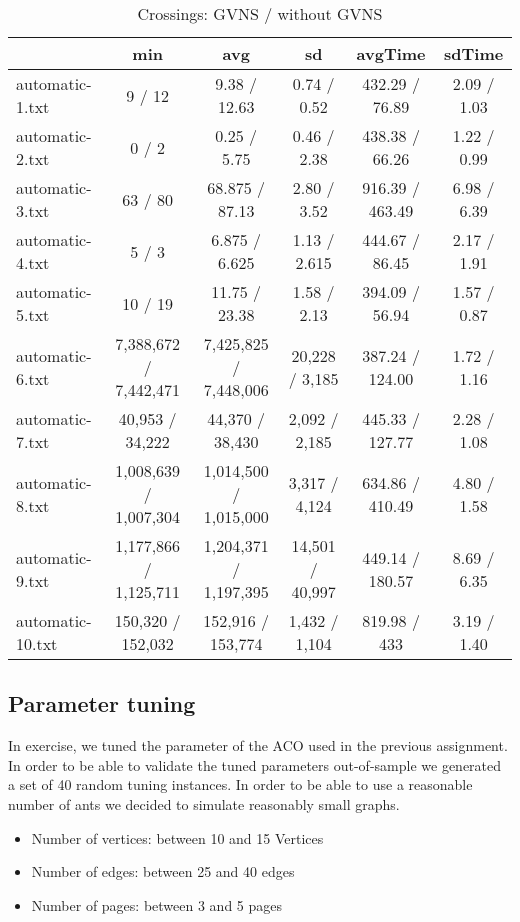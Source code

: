 \documentclass{scrartcl}
\begin{document}
\begin{table}
\scriptsize
\begin{tabular}{lccccc}
  \toprule  & min & avg & sd & avgTime & sdTime \\ 
  \midrule automatic-1.txt & 9 / 12 & 9.38 / 12.63 & 0.74 / 0.52 & 432.29 / 76.89 & 2.09 / 1.03 \\ 
  automatic-2.txt & 0 / 2 & 0.25 / 5.75  & 0.46 / 2.38 & 438.38 / 66.26 & 1.22 / 0.99 \\ 
  automatic-3.txt & 63 / 80 & 68.875 / 87.13 & 2.80 / 3.52 & 916.39 / 463.49 & 6.98 / 6.39 \\ 
  automatic-4.txt & 5 / 3 & 6.875 / 6.625 & 1.13 / 2.615 & 444.67 / 86.45 & 2.17 / 1.91 \\ 
  automatic-5.txt & 10 / 19 & 11.75 / 23.38 & 1.58 / 2.13 & 394.09 / 56.94 & 1.57 / 0.87 \\ 
  automatic-6.txt & 7,388,672 / 7,442,471 & 7,425,825 / 7,448,006 & 20,228 / 3,185 & 387.24 / 124.00 & 1.72 / 1.16 \\ 
  automatic-7.txt & 40,953 / 34,222 & 44,370 / 38,430 & 2,092 / 2,185 & 445.33 / 127.77 & 2.28 / 1.08 \\ 
  automatic-8.txt & 1,008,639 / 1,007,304 & 1,014,500 / 1,015,000  & 3,317 / 4,124 & 634.86 / 410.49 & 4.80 / 1.58 \\ 
  automatic-9.txt & 1,177,866 / 1,125,711 & 1,204,371 / 1,197,395 & 14,501 / 40,997 & 449.14 / 180.57 & 8.69 / 6.35 \\ 
  automatic-10.txt & 150,320 / 152,032 & 152,916 / 153,774 & 1,432 / 1,104 & 819.98 / 433 & 3.19 / 1.40 \\ 
  \bottomrule 
\end{tabular}
\caption{Crossings: GVNS / without GVNS}
\label{tab:results}
\end{table}

\subsection{Parameter tuning}
In exercise, we tuned the parameter of the ACO used in the previous assignment. In order to be able to validate
the tuned parameters out-of-sample we generated a set of 40 random tuning instances. In order to be able to use
a reasonable number of ants we decided to simulate reasonably small graphs. 

\begin{itemize}
  \item Number of vertices: between 10 and 15 Vertices
  \item Number of edges: between 25 and 40 edges
  \item Number of pages: between 3 and 5 pages
\end{itemize}
\end{document}
